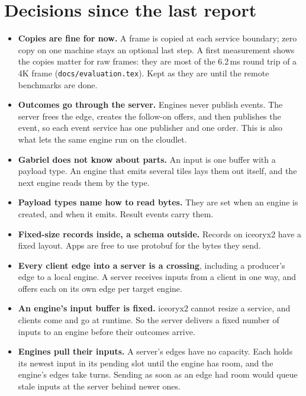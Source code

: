 \documentclass[11pt]{article}
\newcommand{\code}[1]{\texttt{#1}}
\begin{document}
\section{Decisions since the last report}

\begin{itemize}[nosep]
  \item \textbf{Copies are fine for now.} A frame is copied at each service
        boundary; zero copy on one machine stays an optional last step. A
        first measurement shows the copies matter for raw frames: they are
        most of the 6.2\,ms round trip of a 4K frame
        (\code{docs/evaluation.tex}). Kept as they are until the remote
        benchmarks are done.
  \item \textbf{Outcomes go through the server.} Engines never publish events.
        The server frees the edge, creates the follow-on offers, and then
        publishes the event, so each event service has one publisher and one
        order. This is also what lets the same engine run on the cloudlet.
  \item \textbf{Gabriel does not know about parts.} An input is one buffer
        with a payload type. An engine that emits several tiles lays them out
        itself, and the next engine reads them by the type.
  \item \textbf{Payload types name how to read bytes.} They are set when an
        engine is created, and when it emits. Result events carry them.
  \item \textbf{Fixed-size records inside, a schema outside.} Records on
        iceoryx2 have a fixed layout. Apps are free to use protobuf for the
        bytes they send.
  \item \textbf{Every client edge into a server is a crossing}, including a
        producer's edge to a local engine. A server receives inputs from a
        client in one way, and offers each on its own edge per target engine.
  \item \textbf{An engine's input buffer is fixed.} iceoryx2 cannot resize a
        service, and clients come and go at runtime. So the server delivers
        a fixed number of inputs to an engine before their outcomes arrive.
  \item \textbf{Engines pull their inputs.} A server's edges have no
        capacity. Each holds its newest input in its pending slot until the
        engine has room, and the engine's edges take turns. Sending as soon
        as an edge had room would queue stale inputs at the server behind
        newer ones.

\end{itemize}
\end{document}
